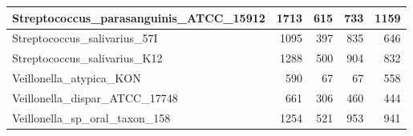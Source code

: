\documentclass[12pt,a4paper]{article}
\begin{document}
\begin{table}[ht]
\begin{center}
\begin{tabular}{|l*{4}{|r}|}
Streptococcus\_parasanguinis\_ATCC\_15912 & 1713 & 615 & 733 & 1159 \\ \hline
Streptococcus\_salivarius\_57I & 1095 & 397 & 835 & 646 \\ \hline
Streptococcus\_salivarius\_K12 & 1288 & 500 & 904 & 832 \\ \hline
Veillonella\_atypica\_KON & 590 & 67 & 67 & 558 \\ \hline
Veillonella\_dispar\_ATCC\_17748 & 661 & 306 & 460 & 444 \\ \hline
Veillonella\_sp\_oral\_taxon\_158 & 1254 & 521 & 953 & 941 \\ \hline
\end{tabular}
\end{center}
\end{table}
\end{document}
